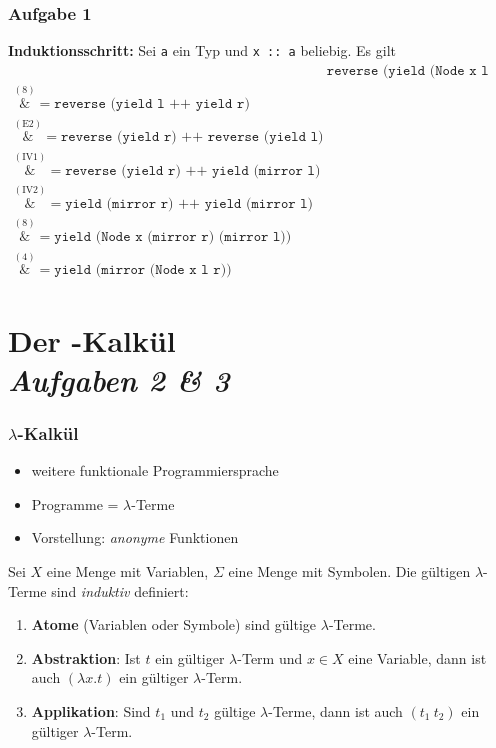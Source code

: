 \documentclass{beamer}
\newcommand*{\astep}[2][]{\ensuremath{\overset{{#1} (\text{#2})}&{=}}}
\begin{document}
\begin{frame} \frametitle{Aufgabe 1}
	\scriptsize
	\textbf{Induktionsschritt:} Sei \texttt{a} ein Typ und \texttt{x :: a} beliebig. Es gilt
	\begin{align*}
		&\texttt{reverse (yield (Node x l r))} \\
		\astep{8} \texttt{reverse (yield l ++ yield r)} \\
		\astep{E2}\texttt{reverse (yield r) ++ reverse (yield l)} \\
		\astep{IV1} \texttt{reverse (yield r) ++ yield (mirror l)} \\
		\astep{IV2} \texttt{yield (mirror r) ++ yield (mirror l)} \\
		\astep{8} \texttt{yield (Node x (mirror r) (mirror l))} \\
		\astep{4} \texttt{yield (mirror (Node x l r))}
		\end{align*}
\end{frame}

\section{Der \textlambda-Kalkül \\ \textit{\normalsize Aufgaben 2 \& 3}}

\begin{frame} \frametitle{$\lambda$-Kalkül}
	\footnotesize
	\begin{itemize}
		\item weitere funktionale Programmiersprache
		\item Programme = $\lambda$-Terme
		\item Vorstellung: \textit{anonyme} Funktionen
	\end{itemize}
	\pause
	
	Sei $X$ eine Menge mit Variablen, $\Sigma$ eine Menge mit Symbolen. Die gültigen $\lambda$-Terme sind \textit{induktiv} definiert:
	\begin{enumerate}[<+->]
		\item \textbf{Atome} (Variablen oder Symbole) sind gültige $\lambda$-Terme.
		\item \textbf{Abstraktion}: Ist $t$ ein gültiger $\lambda$-Term und $x \in X$ eine Variable, dann ist auch $(\lambda x . t)$ ein gültiger $\lambda$-Term.
		\item \textbf{Applikation}: Sind $t_1$ und $t_2$ gültige $\lambda$-Terme, dann ist auch $(t_1 \ t_2)$ ein gültiger $\lambda$-Term.
	\end{enumerate}
\end{frame}
\end{document}

